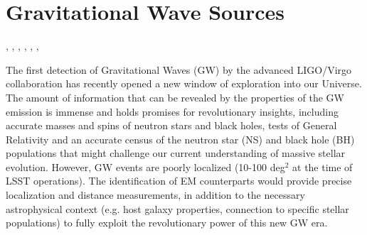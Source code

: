 %
%
%
%
%
%
%

\section{Gravitational Wave Sources}
\def\secname{gw}\label{sec:\secname}


, 
,
,
,
,
,


The first detection of Gravitational Waves (GW) by the advanced LIGO/Virgo collaboration \citep{Abbott16, Abbott09, Acernese08} has recently opened a new window of exploration into our Universe. The amount of information that can be revealed by the properties of the GW emission is immense and holds promises for revolutionary insights, including accurate masses and spins of neutron stars and black holes, tests of General Relativity and an accurate census of the neutron star (NS) and black hole (BH) populations that might challenge our current understanding of massive stellar evolution. However, GW events are poorly localized (10-100 deg$^2$ at the time of LSST operations). The identification of EM counterparts would provide precise localization and distance measurements, in addition to the necessary astrophysical context (e.g. host galaxy properties, connection to specific stellar populations) to fully exploit the revolutionary power of this new GW era.


